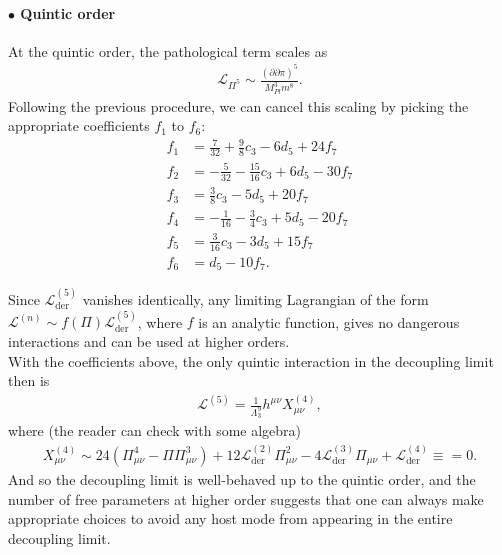 \documentclass{book}
\theoremstyle{definition}
\newcommand{\p}{\partial}
\newcommand{\lag}{\mathcal{L}}
\newcommand{\f}[2]{\frac{#1}{#2}}
\begin{document}
\paragraph{$\bullet$ Quintic order}

At the quintic order, the pathological term scales as
\begin{align}
\lag_{\Pi^5} \sim \f{(\p \p \pi)^5}{M_{Pl}^3 m^8}.
\end{align}
Following the previous procedure, we can cancel this scaling by picking the appropriate coefficients $f_1$ to $f_6$:
\begin{align}\label{coefs}
f_1 &= \f{7}{32} + \f{9}{8}c_3 - 6d_5 + 24f_7 \\
f_2 &= -\f{5}{32} - \f{15}{16}c_3 + 6d_5 - 30 f_7\\
f_3 &= \f{3}{8} c_3 - 5d_5 + 20f_7\\
f_4 &= -\f{1}{16} - \f{3}{4}c_3 + 5d_5 - 20f_7 \\
f_5 &= \f{3}{16}c_3 - 3d_5 + 15f_7\\
f_6 &= d_5 - 10f_7. 
\end{align}

Since $\lag^{(5)}_\text{der}$ vanishes identically, any limiting Lagrangian of the form $\lag^{(n)} \sim f(\Pi) \lag^{(5)}_\text{der}$, where $f$ is an analytic function, gives no dangerous interactions and can be used at higher orders. \\


With the coefficients above, the only quintic interaction in the decoupling limit then is
\begin{align}
\lag^{(5)} = \f{1}{\Lambda_3^9}h^{\mu\nu}X^{(4)}_{\mu\nu},
\end{align}
where (the reader can check with some algebra)
\begin{align}
X^{(4)}_{\mu\nu} \sim 24(\Pi^4_{\mu\nu} - \Pi \Pi^3_{\mu\nu}) + 12\lag^{(2)}_\text{der}\Pi^2_{\mu\nu} - 4\lag^{(3)}_\text{der}\Pi_{\mu\nu} + \lag^{(4)}_\text{der} \equiv =0.
\end{align}
And so the decoupling limit is well-behaved up to the quintic order, and the number of free parameters at higher order suggests that one can always make appropriate choices to avoid any host mode from appearing in the entire decoupling limit. \\
\end{document}

